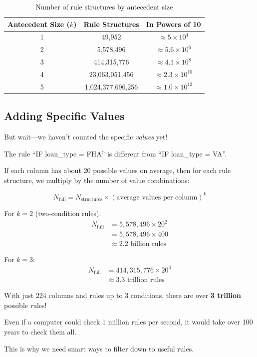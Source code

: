 \documentclass[11pt,a4paper]{article}
\begin{document}
\begin{table}[h]
\centering
\caption{Number of rule structures by antecedent size}
\begin{tabular}{@{}ccc@{}}
\toprule
\textbf{Antecedent Size ($k$)} & \textbf{Rule Structures} & \textbf{In Powers of 10} \\
\midrule
1 & 49,952 & $\approx 5 \times 10^4$ \\
2 & 5,578,496 & $\approx 5.6 \times 10^6$ \\
3 & 414,315,776 & $\approx 4.1 \times 10^8$ \\
4 & 23,063,051,456 & $\approx 2.3 \times 10^{10}$ \\
5 & 1,024,377,696,256 & $\approx 1.0 \times 10^{12}$ \\
\bottomrule
\end{tabular}
\label{tab:rule_structures}
\end{table}

\subsection{Adding Specific Values}

But wait---we haven't counted the specific \textit{values} yet! 

The rule ``IF loan\_type = FHA'' is different from ``IF loan\_type = VA''.

If each column has about 20 possible values on average, then for each rule structure, we multiply by the number of value combinations:

\begin{equation}
N_{\text{full}} = N_{\text{structures}} \times (\text{average values per column})^k
\end{equation}

For $k=2$ (two-condition rules):
\begin{align}
N_{\text{full}} &= 5,578,496 \times 20^2 \\
&= 5,578,496 \times 400 \\
&\approx 2.2 \text{ billion rules}
\end{align}

For $k=3$:
\begin{align}
N_{\text{full}} &= 414,315,776 \times 20^3 \\
&\approx 3.3 \text{ trillion rules}
\end{align}

\begin{infobox}
With just 224 columns and rules up to 3 conditions, there are over \textbf{3 trillion} possible rules! 

Even if a computer could check 1 million rules per second, it would take over 100 years to check them all.

This is why we need smart ways to filter down to useful rules.
\end{infobox}
\end{document}
